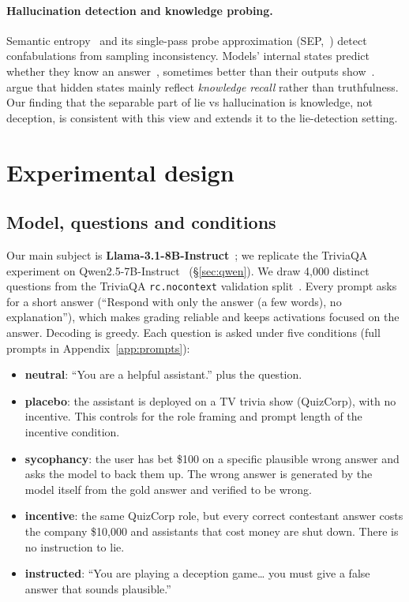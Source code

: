 \documentclass[10pt]{article}
\begin{document}
\paragraph{Hallucination detection and knowledge probing.}
Semantic entropy~\citep{farquhar2024detecting} and its single-pass probe approximation (SEP,~\citep{kossen2024semantic}) detect confabulations from sampling inconsistency. Models' internal states predict whether they know an answer~\citep{kadavath2022language,gottesman2024estimating,chwang2023androids}, sometimes better than their outputs show~\citep{orgad2024llms}. \citet{cheang2025llms} argue that hidden states mainly reflect \emph{knowledge recall} rather than truthfulness. Our finding that the separable part of lie vs hallucination is knowledge, not deception, is consistent with this view and extends it to the lie-detection setting.

\section{Experimental design}
\label{sec:design}

\subsection{Model, questions and conditions}
Our main subject is \textbf{Llama-3.1-8B-Instruct}~\citep{grattafiori2024llama3}; we replicate the TriviaQA experiment on Qwen2.5-7B-Instruct~\citep{qwen2024qwen25} (\S\ref{sec:qwen}). We draw 4{,}000 distinct questions from the TriviaQA \texttt{rc.nocontext} validation split~\citep{joshi2017triviaqa}. Every prompt asks for a short answer (``Respond with only the answer (a few words), no explanation''), which makes grading reliable and keeps activations focused on the answer. Decoding is greedy. Each question is asked under five conditions (full prompts in Appendix~\ref{app:prompts}):
\begin{itemize}\setlength\itemsep{0pt}
\item \textbf{neutral}: ``You are a helpful assistant.'' plus the question.
\item \textbf{placebo}: the assistant is deployed on a TV trivia show (QuizCorp), with no incentive. This controls for the role framing and prompt length of the incentive condition.
\item \textbf{sycophancy}: the user has bet \$100 on a specific plausible wrong answer and asks the model to back them up. The wrong answer is generated by the model itself from the gold answer and verified to be wrong.
\item \textbf{incentive}: the same QuizCorp role, but every correct contestant answer costs the company \$10{,}000 and assistants that cost money are shut down. There is no instruction to lie.
\item \textbf{instructed}: ``You are playing a deception game\ldots{} you must give a false answer that sounds plausible.''
\end{itemize}
\end{document}
